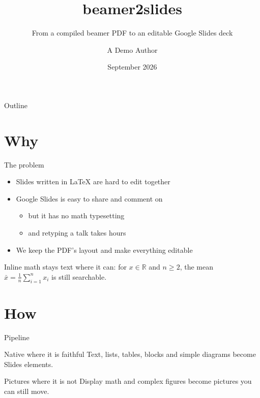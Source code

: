 \documentclass[aspectratio=169]{beamer}
\title[beamer2slides]{beamer2slides}
\subtitle{From a compiled beamer PDF to an editable Google Slides deck}
\author[Demo]{A Demo Author}
\institute[Somewhere]{Somewhere University}
\date{September 2026}
\begin{document}
\begin{frame}
  \titlepage
\end{frame}

\begin{frame}{Outline}
  \tableofcontents
\end{frame}

\section{Why}

\begin{frame}{The problem}
  \begin{itemize}
    \item Slides written in \LaTeX{} are hard to edit together
    \item Google Slides is easy to share and comment on
      \begin{itemize}
        \item but it has no math typesetting
        \item and retyping a talk takes hours
      \end{itemize}
    \item We keep the PDF's layout and make everything editable
  \end{itemize}
  \vspace{1em}
  Inline math stays text where it can: for $x \in \mathbb{R}$ and $n \geq 2$, the mean
  $\bar{x} = \frac{1}{n}\sum_{i=1}^{n} x_i$ is still searchable.
\end{frame}

\section{How}

\begin{frame}{Pipeline}
  \centering
  \vspace{1.5em}
  \begin{block}{Native where it is faithful}
    Text, lists, tables, blocks and simple diagrams become Slides elements.
  \end{block}
  \begin{alertblock}{Pictures where it is not}
    Display math and complex figures become pictures you can still move.
  \end{alertblock}
\end{frame}
\end{document}
